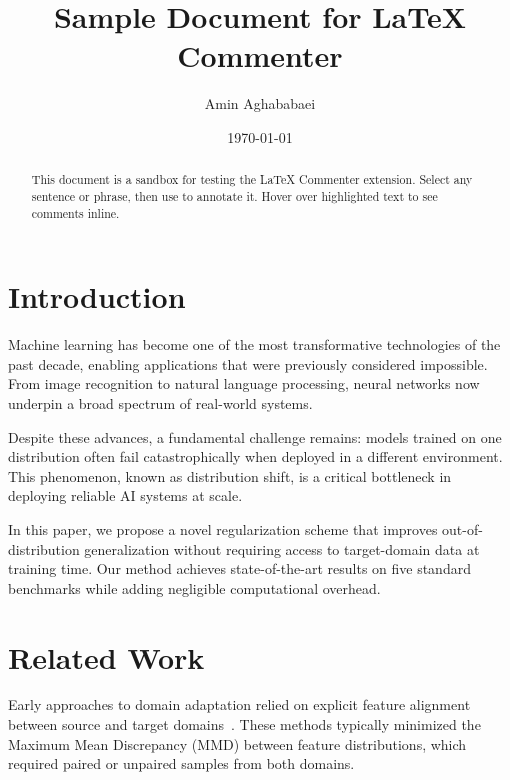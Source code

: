 \documentclass[12pt]{article}
\title{Sample Document for LaTeX Commenter}
\author{Amin Aghababaei}
\date{\today}
\begin{document}
\maketitle

\begin{abstract}
This document is a sandbox for testing the LaTeX Commenter extension.
Select any sentence or phrase, then use to annotate it. Hover over highlighted text to see comments inline.
\end{abstract}

\section{Introduction}

Machine learning has become one of the most transformative technologies of the
past decade, enabling applications that were previously considered impossible.
From image recognition to natural language processing, neural networks now
underpin a broad spectrum of real-world systems.

Despite these advances, a fundamental challenge remains: models trained on one
distribution often fail catastrophically when deployed in a different
environment. This phenomenon, known as distribution shift, is a critical
bottleneck in deploying reliable AI systems at scale.

In this paper, we propose a novel regularization scheme that improves
out-of-distribution generalization without requiring access to target-domain
data at training time. Our method achieves state-of-the-art results on five
standard benchmarks while adding negligible computational overhead.

\section{Related Work}

Early approaches to domain adaptation relied on explicit feature alignment
between source and target domains~\cite{pan2010survey}. These methods typically
minimized the Maximum Mean Discrepancy (MMD) between feature distributions,
which required paired or unpaired samples from both domains.
\end{document}
